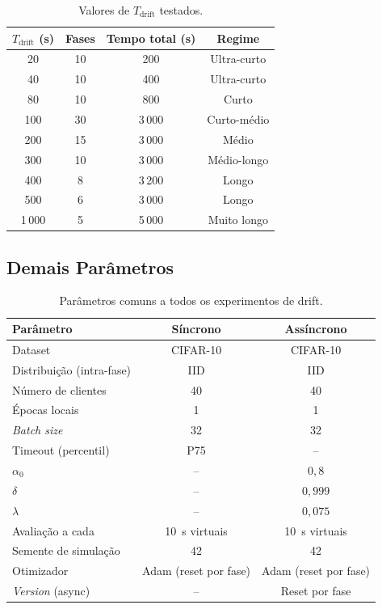 \documentclass[12pt, a4paper]{article}
\begin{document}
\begin{table}[H]
\centering
\caption{Valores de $T_{\text{drift}}$ testados.}
\label{tab:T_values}
\renewcommand{\arraystretch}{1.2}
\begin{tabular}{cccc}
\toprule
$T_{\text{drift}}$ (s) & Fases & Tempo total (s) & Regime \\
\midrule
20  & 10 & 200  & Ultra-curto \\
40  & 10 & 400  & Ultra-curto \\
80  & 10 & 800  & Curto \\
100 & 30 & 3\,000 & Curto-médio \\
200 & 15 & 3\,000 & Médio \\
300 & 10 & 3\,000 & Médio-longo \\
400 &  8 & 3\,200 & Longo \\
500 &  6 & 3\,000 & Longo \\
1\,000 &  5 & 5\,000 & Muito longo \\
\bottomrule
\end{tabular}
\end{table}

\subsection{Demais Parâmetros}

\begin{table}[H]
\centering
\caption{Parâmetros comuns a todos os experimentos de drift.}
\label{tab:params}
\renewcommand{\arraystretch}{1.25}
\begin{tabular}{lcc}
\toprule
\textbf{Parâmetro} & \textbf{Síncrono} & \textbf{Assíncrono} \\
\midrule
Dataset                        & CIFAR-10          & CIFAR-10 \\
Distribuição (intra-fase)      & IID               & IID \\
Número de clientes             & 40                & 40 \\
Épocas locais                  & 1                 & 1 \\
\textit{Batch size}            & 32                & 32 \\
Timeout (percentil)            & P75               & -- \\
$\alpha_0$                     & --                & $0{,}8$ \\
$\delta$                       & --                & $0{,}999$ \\
$\lambda$                      & --                & $0{,}075$ \\
Avaliação a cada               & 10~s virtuais     & 10~s virtuais \\
Semente de simulação           & 42                & 42 \\
Otimizador                     & Adam (reset por fase) & Adam (reset por fase) \\
\textit{Version} (async)       & --                & Reset por fase \\
\bottomrule
\end{tabular}
\end{table}
\end{document}
